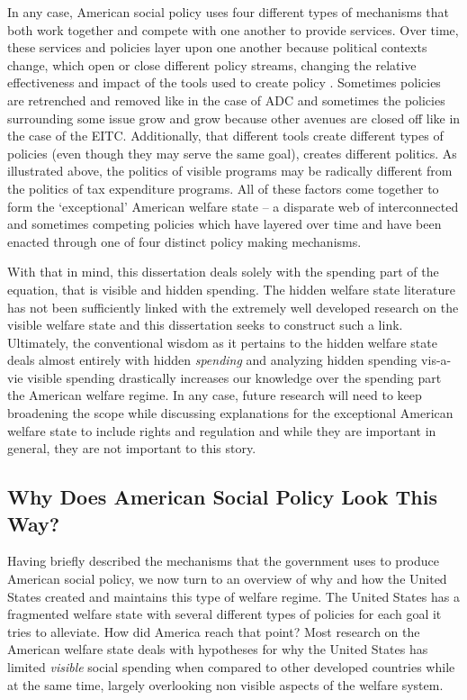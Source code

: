 \documentclass[12pt]{article}
\begin{document}
In any case, American social policy uses four different types of mechanisms that both work together and compete with one another to provide services. Over time, these services and policies layer upon one another because political contexts change, which open or close different policy streams, changing the relative effectiveness and impact of the tools used to create policy \citep{kingdon2011}. Sometimes policies are retrenched and removed like in the case of ADC and sometimes the policies surrounding some issue grow and grow because other avenues are closed off like in the case of the EITC. Additionally, that different tools create different types of policies (even though they may serve the same goal), creates different politics. As illustrated above, the politics of visible programs may be radically different from the politics of tax expenditure programs. All of these factors come together to form the `exceptional' American welfare state -- a disparate web of interconnected and sometimes competing policies which have layered over time and have been enacted through one of four distinct policy making mechanisms.

With that in mind, this dissertation deals solely with the spending part of the equation, that is visible and hidden spending. The hidden welfare state literature has not been sufficiently linked with the extremely well developed research on the visible welfare state and this dissertation seeks to construct such a link. Ultimately, the conventional wisdom as it pertains to the hidden welfare state deals almost entirely with hidden \emph{spending} and analyzing hidden spending vis-a-vie visible spending drastically increases our knowledge over the spending part the American welfare regime. In any case, future research will need to keep broadening the scope while discussing explanations for the exceptional American welfare state to include rights and regulation and while they are important in general, they are not important to this story.

\subsection{Why Does American Social Policy Look This Way?}
Having briefly described the mechanisms that the government uses to produce American social policy, we now turn to an overview of why and how the United States created and maintains this type of welfare regime. The United States has a fragmented welfare state with several different types of policies for each goal it tries to alleviate. How did America reach that point? Most research on the American welfare state deals with hypotheses for why the United States has limited \emph{visible} social spending when compared to other developed countries while at the same time, largely overlooking non visible aspects of the welfare system. 
\end{document}
